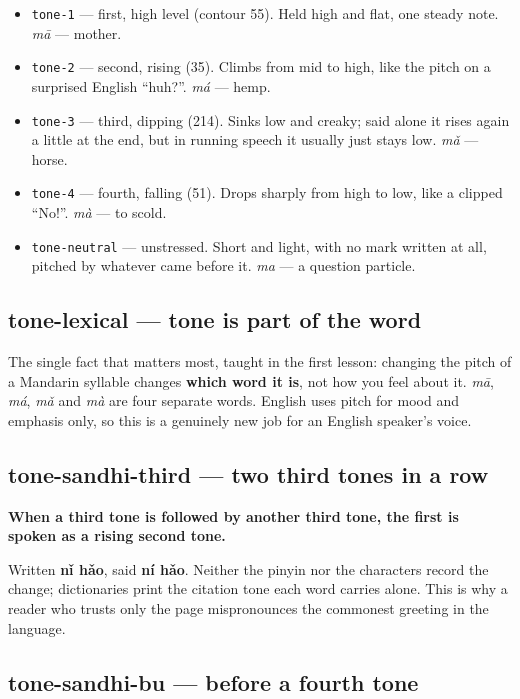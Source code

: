 \begin{itemize}
\raggedright
\setlength{\itemsep}{0.35em}
  \item \texttt{tone-1} — first, high level (contour 55). Held high and flat, one steady note. \emph{mā} — mother.
  \item \texttt{tone-2} — second, rising (35). Climbs from mid to high, like the pitch on a surprised English \textquotedblleft{}huh?\textquotedblright{}. \emph{má} — hemp.
  \item \texttt{tone-3} — third, dipping (214). Sinks low and creaky; said alone it rises again a little at the end, but in running speech it usually just stays low. \emph{mǎ} — horse.
  \item \texttt{tone-4} — fourth, falling (51). Drops sharply from high to low, like a clipped \textquotedblleft{}No!\textquotedblright{}. \emph{mà} — to scold.
  \item \texttt{tone-neutral} — unstressed. Short and light, with no mark written at all, pitched by whatever came before it. \emph{ma} — a question particle.
\end{itemize}

\subsection*{tone-lexical — tone is part of the word}

The single fact that matters most, taught in the first lesson: changing the pitch of a Mandarin syllable changes \textbf{which word it is}, not how you feel about it. \emph{mā}, \emph{má}, \emph{mǎ} and \emph{mà} are four separate words. English uses pitch for mood and emphasis only, so this is a genuinely new job for an English speaker's voice.

\subsection*{tone-sandhi-third — two third tones in a row}

\textbf{When a third tone is followed by another third tone, the first is spoken as a rising second tone.}

Written \textbf{nǐ hǎo}, said \textbf{ní hǎo}. Neither the pinyin nor the characters record the change; dictionaries print the citation tone each word carries alone. This is why a reader who trusts only the page mispronounces the commonest greeting in the language.

\subsection*{tone-sandhi-bu —  before a fourth tone}

